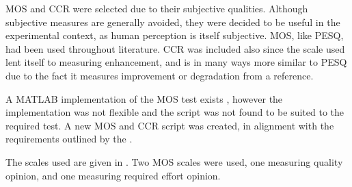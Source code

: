\ac{MOS} and \ac{CCR} were selected due to their subjective qualities.
Although subjective measures are generally avoided, they were decided
to be useful in the experimental context, as human perception is itself
subjective. \ac{MOS}, like \ac{PESQ}, had been used throughout literature.
\ac{CCR} was included also since the scale used lent itself to measuring
enhancement, and is in many ways more similar to \ac{PESQ} due to
the fact it measures improvement or degradation from a reference.

A MATLAB implementation of the \ac{MOS} test exists \citep{Ruzanski2009},
however the implementation was not flexible and the script was not
found to be suited to the required test. A new \ac{MOS} and \ac{CCR}
script was created, in alignment with the requirements outlined by
the \citet{InternationalTelecommunicationUnion1996}.

The scales used are given in . Two \ac{MOS}
scales were used, one measuring quality opinion, and one measuring
required effort opinion.

